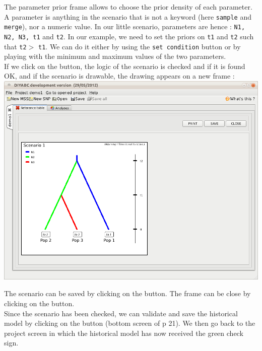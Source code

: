 The parameter prior frame allows to choose the prior density of each parameter. A parameter is anything in the scenario that is not a keyword (here \texttt{sample} and \texttt{merge}), nor a numeric value. In our little scenario, parameters are hence : \texttt{N1, N2, N3, t1} and \texttt{t2}. In our example, we need to set the priors on \texttt{t1} and \texttt{t2} such that \texttt{t2}$>$  \texttt{t1}. We can do it either by using the \texttt{set condition} button or by playing with the minimum and maximum values of the two parameters.\\

If we click on the  button, the logic of the scenario is checked and if it is found OK, and if the scenario is drawable, the drawing appears on a new frame : \\

\includegraphics[scale=0.35]{gui_pictures/Capture-DIYABC-13.png} 

The scenario can be saved by clicking on the  button. The frame can be close by clicking on the  button.\\

Since the scenario has been checked, we can validate and save the historical model by clicking on the   button (bottom screen of p 21). We then go back to the project screen in which the historical model has now received the green check sign.\\

